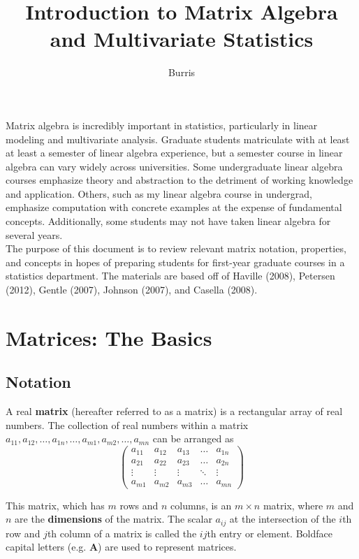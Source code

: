 \documentclass[11pt]{article}
\theoremstyle{definition}
\begin{document}
\title{Introduction to Matrix Algebra and Multivariate Statistics}
\author{Burris}
\date{}
\maketitle

Matrix algebra is incredibly important in statistics, particularly in linear modeling and multivariate analysis.  Graduate students matriculate with at least at least a semester of linear algebra experience, but a semester course in linear algebra can vary widely across universities.  Some undergraduate linear algebra courses emphasize theory and abstraction to the detriment of working knowledge and application.  Others, such as my linear algebra course in undergrad, emphasize computation with concrete examples at the expense of fundamental concepts.  Additionally, some students may not have taken linear algebra for several years.\\

The purpose of this document is to review relevant matrix notation, properties, and concepts in hopes of preparing students for first-year graduate courses in a statistics department.  The materials are based off of Haville (2008), Petersen (2012), Gentle (2007), Johnson (2007), and Casella (2008).    

\section{Matrices: The Basics} 

\subsection{Notation}
A real \textbf{matrix} (hereafter referred to as a matrix) is a rectangular array of real numbers.  The collection of real numbers within a matrix $a_{11}, a_{12}, \hdots, a_{1n}, \hdots, a_{m1}, a_{m2}, \hdots, a_{mn}$ can be arranged as
\[
\begin{pmatrix}
    a_{11} & a_{12} & a_{13} & \dots  & a_{1n} \\
    a_{21} & a_{22} & a_{23} & \dots  & a_{2n} \\
    \vdots & \vdots & \vdots & \ddots & \vdots \\
    a_{m1} & a_{m2} & a_{m3} & \dots  & a_{mn}
\end{pmatrix}
\]

This matrix, which has $m$ rows and $n$ columns, is an $m \times n$ matrix, where $m$ and $n$ are the \textbf{dimensions} of the matrix.  The scalar $a_{ij}$ at the intersection of the $i$th row and $j$th column of a matrix is called the $ij$th entry or element.  Boldface capital letters (e.g. $\mathbf{A}$) are used to represent matrices. \\
\end{document}
